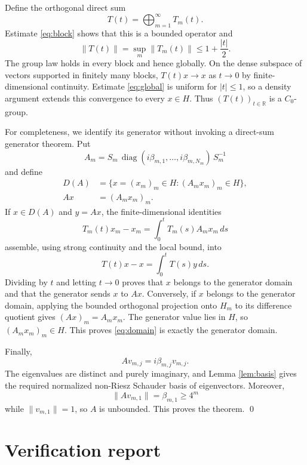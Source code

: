 \documentclass[11pt]{article}
\begin{document}
Define the orthogonal direct sum
\[
                       T(t)=\bigoplus_{m=1}^{\infty}T_m(t).
\]
Estimate \eqref{eq:block} shows that this is a bounded operator and
\[
                    \|T(t)\|=\sup_m\|T_m(t)\|
                    \le 1+\frac{|t|}{2}.              \tag{2}\label{eq:global}
\]
The group law holds in every block and hence globally.  On the dense subspace
of vectors supported in finitely many blocks, $T(t)x\to x$ as $t\to0$ by
finite-dimensional continuity.  Estimate \eqref{eq:global} is uniform for
$|t|\le1$, so a density argument extends this convergence to every $x\in H$.
Thus $(T(t))_{t\in\mathbb R}$ is a $C_0$-group.

For completeness, we identify its generator without invoking a direct-sum
generator theorem.  Put
\[
 A_m=S_m\,\operatorname{diag}
       (i\beta_{m,1},\ldots,i\beta_{m,N_m})\,S_m^{-1}
\]
and define
\[
 \begin{split}
 D(A)&=\{x=(x_m)_m\in H:(A_mx_m)_m\in H\},\\
 Ax&=(A_mx_m)_m.
 \end{split}                                           \tag{3}\label{eq:domain}
\]
If $x\in D(A)$ and $y=Ax$, the finite-dimensional identities
\[
 T_m(t)x_m-x_m=\int_0^tT_m(s)A_mx_m\,ds
\]
assemble, using strong continuity and the local bound, into
\[
                  T(t)x-x=\int_0^tT(s)y\,ds.
\]
Dividing by $t$ and letting $t\to0$ proves that $x$ belongs to the generator
domain and that the generator sends $x$ to $Ax$.  Conversely, if $x$ belongs
to the generator domain, applying the bounded orthogonal projection onto
$H_m$ to its difference quotient gives $(Ax)_m=A_mx_m$.  The generator value
lies in $H$, so $(A_mx_m)_m\in H$.  This proves \eqref{eq:domain} is exactly
the generator domain.

Finally,
\[
             Av_{m,j}=i\beta_{m,j}v_{m,j}.
\]
The eigenvalues are distinct and purely imaginary, and Lemma
\ref{lem:basis} gives the required normalized non-Riesz Schauder basis of
eigenvectors.  Moreover,
\[
                 \|Av_{m,1}\|=\beta_{m,1}\ge4^m
\]
while $\|v_{m,1}\|=1$, so $A$ is unbounded.  This proves the theorem.
\qed

\section{Verification report}
\end{document}

